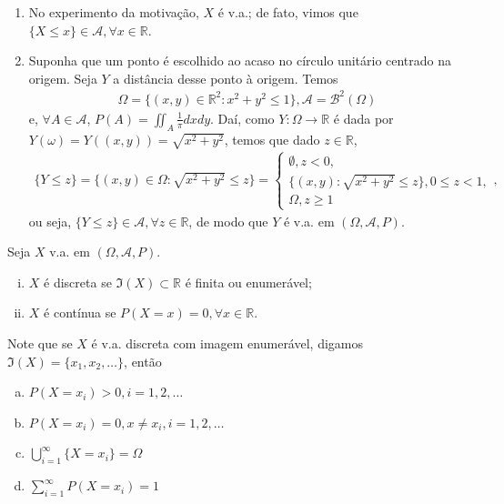 \documentclass[../Notas.tex]{subfiles}
\begin{document}
\begin{examples}
\begin{enumerate}
    \item No experimento da motivação, $X$ é v.a.; de fato, vimos que $\{X\leq x\} \in\mathcal{A}, \forall x\in\mathbb{R}$.
    \item Suponha que um ponto é escolhido ao acaso no círculo unitário centrado na origem. Seja $Y$ a distância desse ponto à origem. Temos
    \begin{align*}
        \Omega = \{ (x,y)\in\mathbb{R}^2 : x^2 + y^2 \leq 1 \}, \mathcal{A} = \mathcal{B}^2(\Omega)
    \end{align*}
    e, $\forall A\in\mathcal{A}$, $\displaystyle{ P(A) = \iint_A \frac{1}{\pi}dxdy }$. Daí, como $Y:\Omega\to\mathbb{R}$ é dada por $Y(\omega) = Y((x,y)) = \sqrt{x^2 + y^2}$, temos que dado $z\in\mathbb{R}$,
    \begin{align*}
        \{ Y\leq z \} = \{ (x,y)\in\Omega : \sqrt{x^2 + y^2} \leq z \} = \begin{cases}
        \emptyset, z < 0, \\
        \{ (x,y) : \sqrt{x^2 + y^2} \leq z \}, 0\leq z < 1, \\
        \Omega, z\geq 1
        \end{cases},
    \end{align*}
    ou seja, $\{Y\leq z\}\in\mathcal{A}, \forall z\in\mathbb{R}$, de modo que $Y$ é v.a. em $(\Omega, \mathcal{A}, P)$.
\end{enumerate}
\end{examples}

\begin{definition}
Seja $X$ v.a. em $(\Omega, \mathcal{A}, P)$.
\begin{enumerate}[(i)]
    \item $X$ é discreta se $\Im(X)\subset\mathbb{R}$ é finita ou enumerável;
    \item $X$ é contínua se $P(X=x) = 0, \forall x\in\mathbb{R}$.
\end{enumerate}
\end{definition}
Note que se $X$ é v.a. discreta com imagem enumerável, digamos $\Im(X) = \{ x_1, x_2, \dots \}$, então
\begin{enumerate}[(a)]
    \item $P(X = x_i) > 0, i = 1, 2, \dots$
    \item $P(X = x_i) = 0, x\neq x_i, i = 1, 2, \dots$
    \item $\displaystyle{ \bigcup_{i=1}^{\infty} \{X = x_i\} = \Omega}$
    \item $\displaystyle{ \sum_{i=1}^{\infty}P(X = x_i) = 1 }$
\end{enumerate}
\end{document}
